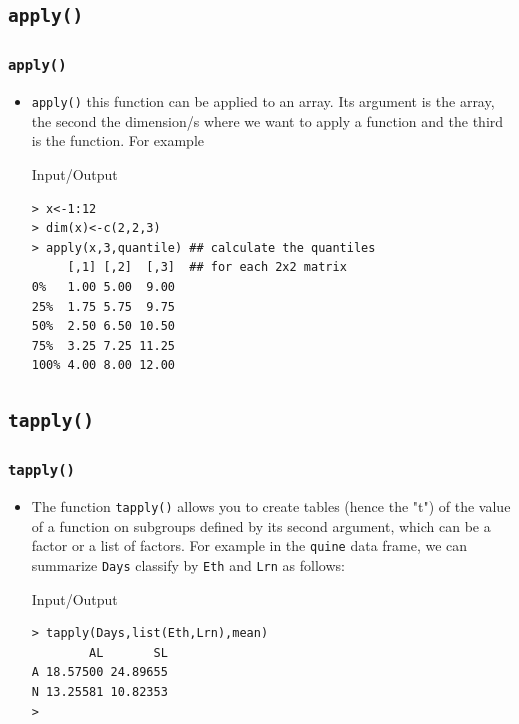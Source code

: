 \documentclass[xcolor={table},c]{beamer}
\begin{document}
\subsection{\texttt{apply()}}
\begin{frame}[fragile]\frametitle{\texttt{apply()}}
\begin{itemize}
\item \texttt{apply()} this function can be applied to an array. Its argument is the array, the second the dimension/s where we want to apply a function and the third is the function. For example
\begin{exampleblock}{Input/Output}
\begin{verbatim}
> x<-1:12
> dim(x)<-c(2,2,3)
> apply(x,3,quantile) ## calculate the quantiles 
     [,1] [,2]  [,3]  ## for each 2x2 matrix
0%   1.00 5.00  9.00
25%  1.75 5.75  9.75
50%  2.50 6.50 10.50
75%  3.25 7.25 11.25
100% 4.00 8.00 12.00
\end{verbatim}
\end{exampleblock}
\end{itemize}
\end{frame}

\subsection{\texttt{tapply()}}
\begin{frame}[fragile]\frametitle{\texttt{tapply()}}
\begin{itemize}
\item The function \texttt{tapply()} allows you to create tables (hence the "t") of the value of a function on subgroups defined by its second argument, which can be a factor or a list of factors.
For example in the \texttt{quine} data frame, we can  summarize \texttt{Days} classify by \texttt{Eth} and \texttt{Lrn} as follows:
\begin{exampleblock}{Input/Output}\small
\begin{verbatim}
> tapply(Days,list(Eth,Lrn),mean)
        AL       SL
A 18.57500 24.89655
N 13.25581 10.82353
>
\end{verbatim}
\end{exampleblock}
\end{itemize}
\end{frame}
\end{document}
